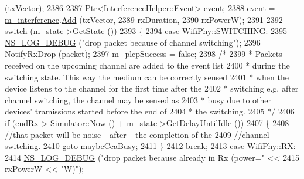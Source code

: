 \begin{DoxyCode}
       (txVector);
2386 
2387   Ptr<InterferenceHelper::Event> event;
2388   \textcolor{keyword}{event} = \hyperlink{classns3_1_1WifiPhy_a55909109ad2e2759702336770fa90119}{m\_interference}.\hyperlink{classns3_1_1InterferenceHelper_a6270ccd46290e2c6dfd600d6ad6c39c4}{Add} (txVector,
2389                               rxDuration,
2390                               rxPowerW);
2391 
2392   \textcolor{keywordflow}{switch} (\hyperlink{classns3_1_1WifiPhy_a020dae8902d858e3d121aa7a67ca2528}{m\_state}->GetState ())
2393     \{
2394     \textcolor{keywordflow}{case} \hyperlink{classns3_1_1WifiPhy_af97408fa76f99797497b492758467143a2d51e3db3a961114a197a35838adeee5}{WifiPhy::SWITCHING}:
2395       \hyperlink{group__logging_ga413f1886406d49f59a6a0a89b77b4d0a}{NS\_LOG\_DEBUG} (\textcolor{stringliteral}{"drop packet because of channel switching"});
2396       \hyperlink{classns3_1_1WifiPhy_a72138f22fada63f61f2026b86aa5abd2}{NotifyRxDrop} (packet);
2397       \hyperlink{classns3_1_1WifiPhy_ad9a571bc52ef6cd8e63cff3dc14a718e}{m\_plcpSuccess} = \textcolor{keyword}{false};
2398       \textcolor{comment}{/*}
2399 \textcolor{comment}{       * Packets received on the upcoming channel are added to the event list}
2400 \textcolor{comment}{       * during the switching state. This way the medium can be correctly sensed}
2401 \textcolor{comment}{       * when the device listens to the channel for the first time after the}
2402 \textcolor{comment}{       * switching e.g. after channel switching, the channel may be sensed as}
2403 \textcolor{comment}{       * busy due to other devices' tramissions started before the end of}
2404 \textcolor{comment}{       * the switching.}
2405 \textcolor{comment}{       */}
2406       \textcolor{keywordflow}{if} (endRx > \hyperlink{classns3_1_1Simulator_ac3178fa975b419f7875e7105be122800}{Simulator::Now} () + \hyperlink{classns3_1_1WifiPhy_a020dae8902d858e3d121aa7a67ca2528}{m\_state}->GetDelayUntilIdle ())
2407         \{
2408           \textcolor{comment}{//that packet will be noise \_after\_ the completion of the}
2409           \textcolor{comment}{//channel switching.}
2410           \textcolor{keywordflow}{goto} maybeCcaBusy;
2411         \}
2412       \textcolor{keywordflow}{break};
2413     \textcolor{keywordflow}{case} \hyperlink{classns3_1_1WifiPhy_af97408fa76f99797497b492758467143a7c7899649be8e296e8907e47aacf148e}{WifiPhy::RX}:
2414       \hyperlink{group__logging_ga413f1886406d49f59a6a0a89b77b4d0a}{NS\_LOG\_DEBUG} (\textcolor{stringliteral}{"drop packet because already in Rx (power="} <<
2415                     rxPowerW << \textcolor{stringliteral}{"W)"});

\end{DoxyCode}
